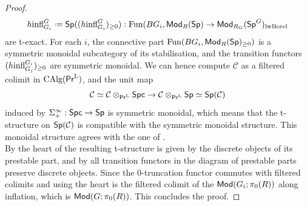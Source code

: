 \documentclass[reqno]{amsart}
\numberwithin{equation}{section}\theoremstyle{thms}
\theoremstyle{defn}
\newcommand{\cC}{\mathcal{C}}
\newcommand{\tn}[1]{\textnormal{#1}}
\newcommand{\tsf}[1]{\textsf{\textup{#1}}}
\newcommand*{\defeq}{\mathrel{\vcenter{\baselineskip0.4ex \lineskiplimit0pt
\hbox{\scriptsize.}\hbox{\scriptsize.}}}%
=}
\newcommand{\fun}{\tn{Fun}}
\newcommand{\calg}{\tn{CAlg}}
\newcommand{\Mod}{\tsf{Mod}}
\newcommand{\spec}{\tsf{Sp}}
\newcommand{\specg}{\tsf{Sp}^G}
\newcommand{\spc}{\tsf{Spc}}
\newcommand{\prl}{\tsf{Pr}^{\tn{L}}}
\begin{document}
\begin{proof}
$$h\tn{infl}^{G}_{G_i} \defeq \spec((h\tn{infl}^{G}_{G_i})_{\geq 0}): \fun(BG_i,\Mod_R(\spec) \to \Mod_{R_G}(\specg)_{\tn{lwBorel}}$$
are t-exact. For each $i$, the connective part $\fun(BG_i,\Mod_R(\spec)_{\geq 0})$ is a symmetric monoidal subcategory of its stabilisation, and the transition functors $(h\tn{infl}^{G_i}_{G_j})_{\geq 0}$ are symmetric monoidal. We can hence compute $\cC$ as a filtered colimit in $\calg(\prl)$, and the unit map 
$$\cC \simeq \cC \otimes_{\prl} \spc \to \cC \otimes_{\prl} \spec \simeq \spec(\cC)$$ 
induced by $\Sigma^\infty_+: \spc \to \spec$ is symmetric monoidal, which means that the t-structure on $\spec(\cC)$ is compatible with the symmetric monoidal structure. This monoidal structure agrees with the one of . \\
By \cite[§C.1.2]{lur18} the heart of the resulting t-structure is given by the discrete objects of its prestable part, and by \cite[Proposition C.3.2.1]{lur18} all transition functors in the diagram of prestable parts preserve discrete objects. Since the $0$-truncation functor commutes with filtered colimits and using  the heart is the filtered colimit of the $\Mod(G_i;\pi_0(R))$ along inflation, which is $\Mod(G;\pi_0(R))$. This concludes the proof.
\end{proof}
\end{document}
